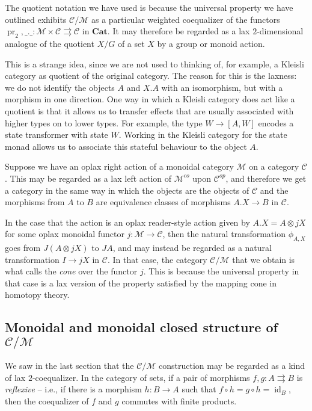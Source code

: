 \documentclass{svproc}
\newcommand\C{\mathcal{C}}
\newcommand\M{\mathcal{M}}
\DeclareMathOperator\pr{pr}
\DeclareMathOperator\id{id}
\newcommand\tensor\otimes
\newcommand*\from{\colon}
\newcommand{\0}{{\mathtt{0}}} \newcommand{\com}{{\mathtt{com}}}
\newcommand{\catname}[1]{\mathbf{#1}}
\newcommand{\Cat}{\catname{Cat}}
\begin{document}
\begin{remark}
  The quotient notation we have used is because the universal property we have outlined exhibits $\C/\M$ as a particular weighted coequalizer of the functors $\pr_2,\_.\_\from \M\times\C \rightrightarrows \C$ in $\Cat$.
  It may therefore be regarded as a lax $2$-dimensional analogue of the quotient $X/G$ of a set $X$ by a group or monoid action.  
  
  This is a strange idea, since we are not used to thinking of, for example, a Kleisli category as quotient of the original category.  
  The reason for this is the laxness: we do not identify the objects $A$ and $X.A$ with an isomorphism, but with a morphism in one direction.  
  One way in which a Kleisli category does act like a quotient is that it allows us to transfer effects that are usually associated with higher types on to lower types.  
  For example, the type $W\to [A,W]$ encodes a state transformer with state $W$.  
  Working in the Kleisli category for the state monad allows us to associate this stateful behaviour to the object $A$.
\end{remark}
\begin{remark}
  Suppose we have an oplax right action of a monoidal category $\M$ on a category $\C$.  
  This may be regarded as a lax left action of $\M^{co}$ upon $\C^{op}$, and therefore we get a category in the same way in which the objects are the objects of $\C$ and the morphisms from $A$ to $B$ are equivalence classes of morphisms $A.X \to B$ in $\C$.

  In the case that the action is an oplax reader-style action given by $A.X = A\tensor jX$ for some oplax monoidal functor $j\from \M \to \C$, then the natural transformation $\phi_{A,X}$ goes from $J(A\tensor jX)$ to $JA$, and may instead be regarded as a natural transformation $I\to jX$ in $\C$.  
  In that case, the category $\C/\M$ that we obtain is what \cite[4.3.11]{lurie2009} calls the \emph{cone} over the functor $j$.  
  This is because the universal property in that case is a lax version of the property satisfied by the mapping cone in homotopy theory.
\end{remark}

\subsection{Monoidal and monoidal closed structure of $\C/\M$}

We saw in the last section that the $\C/\M$ construction may be regarded as a kind of lax $2$-coequalizer.  
In the category of sets, if a pair of morphisms $f,g\from A \rightrightarrows B$ is \emph{reflexive} -- i.e., if there is a morphism $h\from B \to A$ such that $f\circ h = g\circ h = \id_B$, then the coequalizer of $f$ and $g$ commutes with finite products.  
\end{document}
